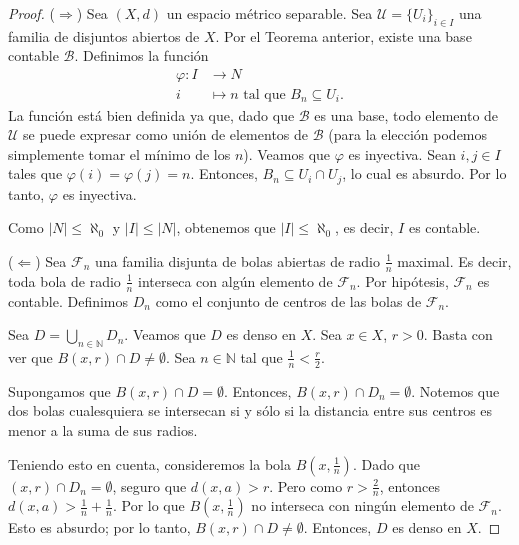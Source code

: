 \begin{proof}
	($\Rightarrow$) Sea $(X, d)$ un espacio métrico separable. Sea $\mathcal{U} = \{ U_i \}_{i \in I}$ una familia de disjuntos abiertos de $X$. Por el Teorema anterior, existe una base contable $\mathcal{B}$. Definimos la función
	\begin{align*}
		\varphi: I & \to  N                                         \\
		i          & \mapsto n \text{ tal que } B_n \subseteq U_i .
	\end{align*}
	La función está bien definida ya que, dado que $\mathcal{B}$ es una base, todo elemento de $\mathcal{U}$ se puede expresar como unión de elementos de $\mathcal{B}$ (para la elección podemos simplemente tomar el mínimo de los $n$). Veamos que $\varphi$ es inyectiva. Sean $i, j \in I$ tales que $\varphi(i) = \varphi(j) = n$. Entonces, $B_n \subseteq U_i \cap  U_j$, lo cual es absurdo. Por lo tanto, $\varphi$ es inyectiva.

	Como $\left| N \right| \leq \aleph_0$ y $\left| I \right| \leq \left| N \right| $, obtenemos que $\left| I \right| \leq \aleph_0$, es decir, $I$ es contable.

	($\Leftarrow$) Sea $\mathcal{F}_n$ una familia disjunta de bolas abiertas de radio $\frac{1}{n}$ maximal. Es decir, toda bola de radio $\frac{1}{n}$ interseca con algún elemento de $\mathcal{F}_n$. Por hipótesis, $\mathcal{F}_n$ es contable. Definimos $D_n$ como el conjunto de centros de las bolas de $\mathcal{F}_n$.

	Sea $D = \bigcup_{n \in \mathbb{N}} D_n$. Veamos que $D$ es denso en $X$. Sea $x \in X$, $r > 0$. Basta con ver que $B(x, r) \cap D \neq \emptyset$. Sea $n \in \mathbb{N}$ tal que $\frac{1}{n} < \frac{r}{2}$.

	Supongamos que $B(x, r) \cap D = \emptyset$. Entonces, $B(x, r) \cap D_n = \emptyset$. Notemos que dos bolas cualesquiera se intersecan si y sólo si la distancia entre sus centros es menor a la suma de sus radios.

	Teniendo esto en cuenta, consideremos la bola $B(x, \frac{1}{n})$. Dado que $(x, r) \cap D_n = \emptyset$, seguro que $d(x, a) > r$. Pero como $r > \frac{2}{n}$, entonces $d(x, a) > \frac{1}{n} + \frac{1}{n}$. Por lo que $B(x, \frac{1}{n})$ no interseca con ningún elemento de $\mathcal{F}_n$. Esto es absurdo; por lo tanto, $B(x, r) \cap D \neq \emptyset$. Entonces, $D$ es denso en $X$.
\end{proof}



